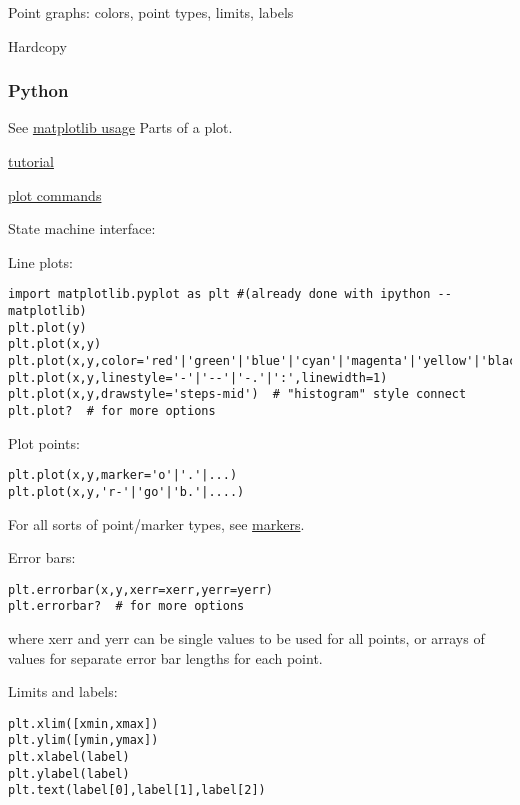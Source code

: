 \documentclass{article}
\begin{document}
Point graphs: colors, point types, limits, labels

Hardcopy


\subsubsection{Python}
See \href{http://matplotlib.org/faq/usage_faq.html}{matplotlib usage}
Parts of a plot.

\href{http://matplotlib.org/users/pyplot_tutorial.html}
{tutorial}

\href{http://matplotlib.org/api/pyplot_summary.html}
{plot commands}

State machine interface:

Line plots:

\begin{verbatim}
import matplotlib.pyplot as plt #(already done with ipython --matplotlib)
plt.plot(y)
plt.plot(x,y)
plt.plot(x,y,color='red'|'green'|'blue'|'cyan'|'magenta'|'yellow'|'black'|....)
plt.plot(x,y,linestyle='-'|'--'|'-.'|':',linewidth=1)
plt.plot(x,y,drawstyle='steps-mid')  # "histogram" style connect
plt.plot?  # for more options
\end{verbatim}

Plot points:
\begin{verbatim}
plt.plot(x,y,marker='o'|'.'|...)
plt.plot(x,y,'r-'|'go'|'b.'|....)
\end{verbatim}

For all sorts of point/marker types, see
\href{http://matplotlib.org/api/markers_api.html}
{markers}.

Error bars:
\begin{verbatim}
plt.errorbar(x,y,xerr=xerr,yerr=yerr)
plt.errorbar?  # for more options
\end{verbatim}
where xerr and yerr can be single values to be used for all points, or
arrays of values for separate error bar lengths for each point.

Limits and labels:
\begin{verbatim}
plt.xlim([xmin,xmax])
plt.ylim([ymin,ymax])
plt.xlabel(label)
plt.ylabel(label)
plt.text(label[0],label[1],label[2])
\end{verbatim}
\end{document}
